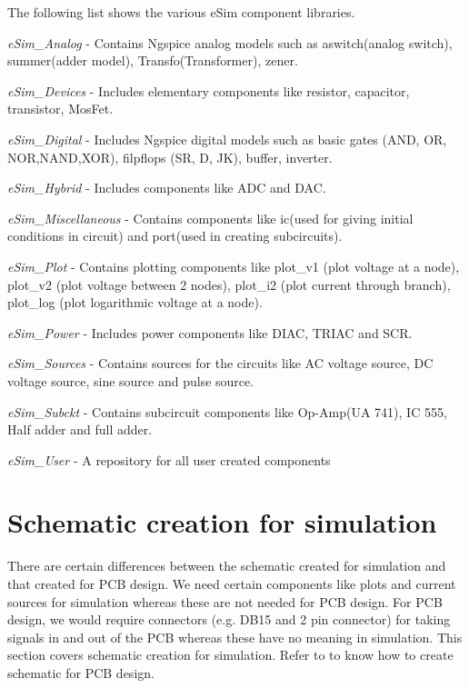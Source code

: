 The following list shows the various eSim component libraries.

\begin{compactitem}
\item \textit {eSim\_Analog} - Contains Ngspice analog models such as aswitch(analog switch), summer(adder model), Transfo(Transformer), zener.
\item \textit {eSim\_Devices} -  Includes elementary components like resistor, capacitor, transistor, MosFet.
\item \textit {eSim\_Digital} -  Includes Ngspice digital models such as basic gates (AND, OR, NOR,NAND,XOR), filpflops (SR, D, JK), buffer, inverter.
\item \textit {eSim\_Hybrid} - Includes components like ADC and DAC.
\item \textit {eSim\_Miscellaneous} -  Contains components like ic(used for giving initial conditions in circuit) and port(used in creating subcircuits).
\item \textit {eSim\_Plot} -  Contains plotting components like plot\_v1 (plot voltage at a node), plot\_v2 (plot voltage between 2 nodes), plot\_i2 (plot current through branch), plot\_log (plot logarithmic voltage at a node).
\item \textit {eSim\_Power} -  Includes power components like DIAC, TRIAC and SCR.
\item \textit {eSim\_Sources} -  Contains sources for the circuits like AC voltage source, DC voltage source, sine source and pulse source.
\item \textit {eSim\_Subckt} -  Contains subcircuit components like Op-Amp(UA 741), IC 555, Half adder and full adder.
\item \textit {eSim\_User} - A repository for all user created components
\end{compactitem}

\section{Schematic creation for simulation}  
There are certain differences between the schematic created for
simulation and that created for PCB design. We need certain components
like plots and current sources for simulation whereas these are not
needed for PCB design. For PCB design, we would require connectors
(e.g. DB15 and 2 pin connector) for taking signals in and out of the
PCB whereas these have no meaning in simulation. This section covers schematic creation for simulation. Refer to  to know how to create schematic for PCB design.


